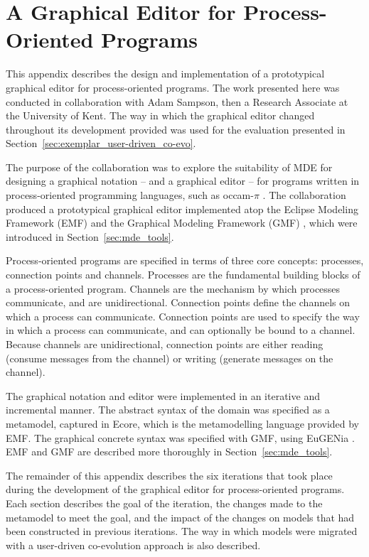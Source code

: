 
\chapter[A Graphical Editor for Process-Oriented Programs][An Exemplar Graphical Model Editor]{A Graphical Editor for Process-Oriented Programs}
\label{ProcessOriented}

This appendix describes the design and implementation of a prototypical graphical editor for process-oriented programs. The work presented here was conducted in collaboration with Adam Sampson, then a Research Associate at the University of Kent. The way in which the graphical editor changed throughout its development provided was used for the evaluation presented in Section~\ref{sec:exemplar_user-driven_co-evo}.

The purpose of the collaboration was to explore the suitability of MDE  for designing a graphical notation -- and a graphical editor -- for programs written in process-oriented programming languages, such as occam-$\pi$ \cite{occam_pi}. The collaboration produced a prototypical graphical editor implemented atop the Eclipse Modeling Framework (EMF) \cite{steinberg09emf} and the Graphical Modeling Framework (GMF) \cite{gronback09emp}, which were introduced in Section~\ref{sec:mde_tools}.

Process-oriented programs are specified in terms of three core concepts: processes, connection points and channels. Processes are the fundamental building blocks of a process-oriented program. Channels are the mechanism by which processes communicate, and are unidirectional. Connection points define the channels on which a process can communicate. Connection points are used to specify the way in which a process can communicate, and can optionally be bound to a channel. Because channels are unidirectional, connection points are either reading (consume messages from the channel) or writing (generate messages on the channel).

The graphical notation and editor were implemented in an iterative and incremental manner. The abstract syntax of the domain was specified as a metamodel, captured in Ecore, which is the metamodelling language provided by EMF. The graphical concrete syntax was specified with GMF, using EuGENia \cite{kolovos09eugenia}. EMF and GMF are described more thoroughly in Section~\ref{sec:mde_tools}.

The remainder of this appendix describes the six iterations that took place during the development of the graphical editor for process-oriented programs. Each section describes the goal of the iteration, the changes made to the metamodel to meet the goal, and the impact of the changes on models that had been constructed in previous iterations. The way in which models were migrated with a user-driven co-evolution approach is also described.

